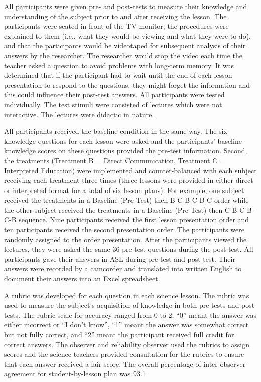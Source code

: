 \documentclass[11.5pt]{sig-alternate} %
\begin{document}
\begin{large}
All participants were given pre- and post-tests to measure their knowledge and understanding of the subject prior to and after receiving the lesson. The participants were seated in front of the TV monitor, the procedures were explained to them (i.e., what they would be viewing and what they were to do), and that the participants would be videotaped for subsequent analysis of their answers by the researcher. The researcher would stop the video each time the teacher asked a question to avoid problems with long-term memory. It was determined that if the participant had to wait until the end of each lesson presentation to respond to the questions, they might forget the information and this could influence their post-test answers. All participants were tested individually. The test stimuli were consisted of lectures which were not interactive. The lectures were didactic in nature. 

All participants received the baseline condition in the same way. The six knowledge questions for each lesson were asked and the participants’ baseline knowledge scores on these questions provided the pre-test information. Second, the treatments  (Treatment B = Direct Communication, Treatment C = Interpreted Education) were implemented and counter-balanced with each subject receiving each treatment three times (three lessons were provided in either direct or interpreted format for a total of six lesson plans). For example, one subject received the treatments in a Baseline (Pre-Test) then B-C-B-C-B-C order while the other subject received the treatments in a Baseline (Pre-Test) then C-B-C-B-C-B sequence. Nine participants received the first lesson presentation order and ten participants received the second presentation order. The participants were randomly assigned to the order presentation. After the participants viewed the lectures, they were asked the same 36 pre-test questions during the post-test. All participants gave their answers in ASL during pre-test and post-test. Their answers were recorded by a camcorder and translated into written English to document their answers into an Excel spreadsheet.

A rubric was developed for each question in each science lesson. The rubric was used to measure the subject’s acquisition of knowledge in both pre-tests and post-tests. The rubric scale for accuracy ranged from 0 to 2. “0” meant the answer was either incorrect or “I don’t know”, “1” meant the answer was somewhat correct but not fully correct, and “2” meant the participant received full credit for correct answers. The observer and reliability observer used the rubrics to assign scores and the science teachers provided consultation for the rubrics to ensure that each answer received a fair score. The overall percentage of inter-observer agreement for student-by-lesson plan was 93.1%


\end{large}
\end{document}
